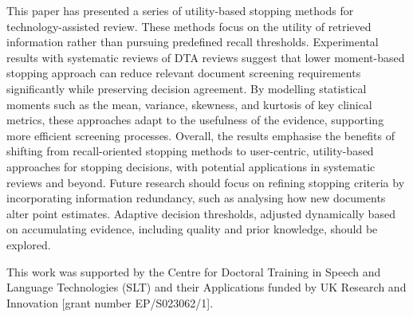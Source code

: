 \documentclass[sigconf,natbib=true,anonymous=true]{acmart}
\begin{document}
This paper has presented a series of utility-based stopping methods for technology-assisted review. These methods focus on the utility of retrieved information rather than pursuing predefined recall thresholds. Experimental results with systematic reviews of DTA reviews suggest that lower moment-based stopping approach can reduce relevant document screening requirements significantly while preserving decision agreement. By modelling statistical moments such as the mean, variance, skewness, and kurtosis of key clinical metrics, these approaches adapt to the usefulness of the evidence, supporting more efficient screening processes. Overall, the results emphasise the benefits of shifting from recall-oriented stopping methods to user-centric, utility-based approaches for stopping decisions, with potential applications in systematic reviews and beyond. Future research should focus on refining stopping criteria by incorporating information redundancy, such as analysing how new documents alter point estimates. Adaptive decision thresholds, adjusted dynamically based on accumulating evidence, including quality and prior knowledge, should be explored.

\begin{acks}
This work was supported by the Centre for Doctoral Training in Speech and Language Technologies (SLT) and their Applications funded by UK Research and Innovation [grant number EP/S023062/1].
\end{acks}






\end{document}
